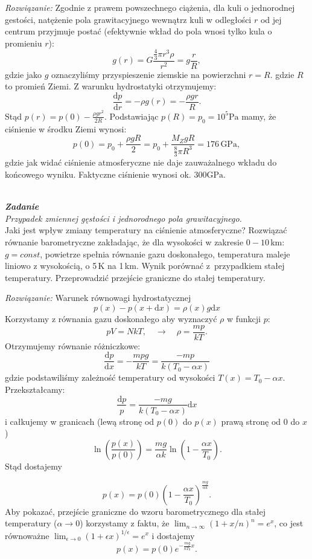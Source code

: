 \documentclass[11pt,a4paper]{article}
\newcounter{zadanie}\newcommand{\zadanie}[1][]{\addtocounter{zadanie}{1} ~\\  {\bf \emph{Zadanie \arabic{zadanie} #1 }} \\}
\renewcommand{\t}[1]{\textrm{#1}}
\begin{document}
\emph{Rozwiązanie:}
Zgodnie z prawem powszechnego ciążenia, dla kuli o jednorodnej gestości, natężenie pola grawitacyjnego wewnątrz kuli w odległości $r$ od jej centrum przyjmuje postać (efektywnie wkład do pola wnosi tylko kula o promieniu $r$):
$$
g(r) = G \frac{\frac{4}{3}\pi r^3 \rho}{r^2} = g \frac{r}{R},
$$
gdzie jako $g$ oznaczyliśmy przyspieszenie ziemskie na powierzchni $r=R$. gdzie $R$ to promień Ziemi.
Z warunku hydrostatyki otrzymujemy:
$$
\frac{\t{d} p}{\t{d} r} = - \rho g(r) = - \frac{\rho g r}{R}.
$$
Stąd $p(r) = p(0) - \frac{\rho g r^2}{2 R}$. Podstawiając $p(R) = p_0 = 10^5 \t{Pa}$ mamy, że ciśnienie w środku Ziemi wynosi:
$$
p(0) = p_0 + \frac{\rho g R}{2} =  p_0 + \frac{M_Z g R}{\frac{8}{3} \pi R^3} = 176\,\t{GPa},
$$
gdzie jak widać ciśnienie atmosferyczne nie daje zauważalnego wkładu do końcowego wyniku.
Faktyczne ciśnienie wynosi ok. $300 \textrm{GPa}$.

\newpage

\zadanie
{\em Przypadek zmiennej gęstości i jednorodnego pola grawitacyjnego.} \\
Jaki jest wpływ zmiany temperatury na ciśnienie atmosferyczne?
Rozwiązać równanie barometryczne zakładając, że dla wysokości w zakresie $0-10$\,km:
$g=const$, powietrze spełnia równanie gazu doskonałego,
temperatura maleje liniowo z wysokością, o 5\,K na 1\,km.
Wynik porównać z~przypadkiem stałej temperatury.
Przeprowadzić przejście graniczne do stałej temperatury.
\newline

\emph{Rozwiązanie:}
Warunek równowagi hydrostatycznej
$$
p(x) - p(x+\t{d}x) = \rho(x) g \t{d}x
$$
Korzystamy z równania gazu doskonałego aby wyznaczyć $\rho$ w funkcji $p$:
$$
p V = N k T, \quad \rightarrow \quad \rho = \frac{m p }{k T}.
$$
Otrzymujemy równanie różniczkowe:
$$
\frac{\t{d}p}{\t{d}x} = -\frac{m p g}{k T} = \frac{- m p}{k (T_0 -\alpha x)}
$$
gdzie podstawiliśmy zależność temperatury od wysokości $T(x) = T_0 - \alpha x$.
Przekształcamy:
$$
\frac{\t{d}p}{p} = \frac{- m g }{k (T_0 -\alpha x)} \t{d}x
$$
i całkujemy w granicach (lewą stronę od $p(0)$ do $p(x)$  prawą stronę od $0$  do $x$)
$$
\ln\left(\frac{p(x)}{p(0)}\right) = \frac{m g }{\alpha k } \ln\left(1 - \frac{\alpha x}{T_0}  \right).
$$
Stąd dostajemy

$$p(x) = p(0)\left(1- \frac{\alpha x}{T_0}\right)^{\frac{m g}{\alpha k}}.
$$
Aby pokazać, przejście graniczne do wzoru barometrycznego dla stałej temperatury ($\alpha \rightarrow 0$) korzystamy z faktu, że  $\lim_{n\rightarrow \infty} (1+x/n)^n =e^x$, co jest równoważne
$\lim_{\epsilon \rightarrow 0 } (1+\epsilon x)^{1/\epsilon} =e^x$ i dostajemy
$$
p(x) = p(0)e^{- \frac{m g }{k T_0} x}.
$$
\end{document}
